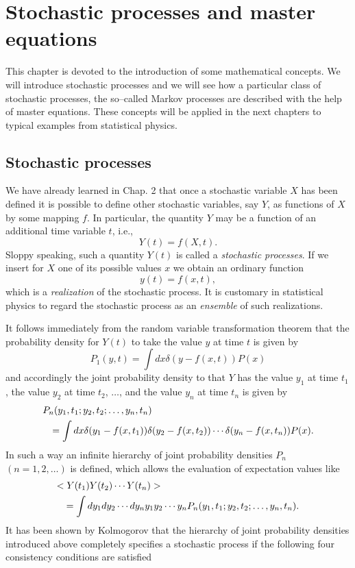 \chapter{Stochastic processes and master equations}
This chapter is devoted
to the introduction of some mathematical concepts. 
We will introduce stochastic processes and we will 
see how a particular class of stochastic 
processes, the so--called Markov processes  are described 
with the help of master equations. These concepts will be applied
in the next chapters to typical examples from statistical physics.

\section{Stochastic processes}
We have already learned in Chap. 2 that once a stochastic variable 
$X$ has been defined it is possible to define other stochastic 
variables, say $Y$, as functions of $X$ by some mapping $f$. In 
particular, the quantity $Y$ may be a function of an additional
time variable $t$, i.e.,
\begin{equation*}
Y(t) = f(X,t).
\end{equation*}
Sloppy speaking, such a quantity $Y(t)$ is called a {\em stochastic
processes}. If we insert for $X$ one of its possible values $x$
we obtain an ordinary function
\begin{equation*}
y(t) = f(x,t),
\end{equation*}
which is a {\em realization} of the stochastic process. It is 
customary in statistical physics to regard the stochastic process 
as an {\em ensemble} of such realizations.

It follows immediately from the random variable transformation 
theorem that the probability density for $Y(t)$ to take the value
$y$ at time $t$ is given by
\begin{equation*}
P_1(y,t) = \int dx  \delta(y-f(x,t)) P(x)
\end{equation*}
and accordingly the joint probability density to  that $Y$ has the
value $y_1$ at time $t_1$, the value $y_2$ at time $t_2$, 
$\ldots$, and the value $y_n$ at time $t_n$ is given by
\begin{eqnarray*}
\lefteqn{P_n(y_1,t_1;y_2,t_2; \ldots, y_n,t_n)} \\
&& = \int dx \delta(y_1-f(x,t_1))\delta(y_2-f(x,t_2)) \cdots 
   \delta(y_n-f(x,t_n))  P(x).
\end{eqnarray*}
In such a way an infinite hierarchy of joint probability densities
$P_n$ $(n=1,2,\ldots)$ is defined, which allows the evaluation of 
expectation values like
\begin{eqnarray*}
\lefteqn{<Y(t_1) Y(t_2) \cdots Y(t_n)>} \\
&& = \int dy_1 dy_2 \cdots dy_n 
        y_1 y_2 \cdots y_n P_n(y_1,t_1;y_2,t_2; \ldots, y_n,t_n).
\end{eqnarray*}
It has been shown by Kolmogorov \cite{KOLMOGOROV} that the 
hierarchy of joint probability densities introduced above 
completely specifies
a stochastic process if the following four consistency conditions 
are satisfied

